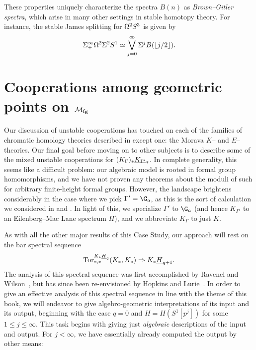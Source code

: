 \begin{remark}
These properties uniquely characterize the spectra \(B(n)\) as \textit{Brown--Gitler spectra}, which arise in many other settings in stable homotopy theory.  For instance, the stable James splitting for \(\Omega^2 S^3\) is given by \[\Sigma^\infty_+ \Omega^2 \Sigma^2 S^1 \simeq \bigvee_{j=0}^\infty \Sigma^j B(\lfloor j/2 \rfloor).\]
\end{remark}










\section{Cooperations among geometric points on \texorpdfstring{\(\mathcal{M}_{\mathbf{fg}}\)}{Mfg}}\label{CoopnsForMoravaKandHA}


Our discussion of unstable cooperations has touched on each of the families of chromatic homology theories described in  except one: the Morava \(K\)-- and \(E\)--theories.  Our final goal before moving on to other subjects is to describe some of the mixed unstable cooperations for \((K_\Gamma)_* \OS{K_{\Gamma'}}{*}\).  In complete generality, this seems like a difficult problem: our algebraic model is rooted in formal group homomorphisms, and we have not proven any theorems about the moduli of such for arbitrary finite-height formal groups.  However, the landscape brightens considerably in the case where we pick \(\Gamma' = \G_a\), as this is the sort of calculation we considered in  and .  In light of this, we specialize \(\Gamma'\) to \(\G_a\) (and hence \(K_{\Gamma'}\) to an Eilenberg--Mac Lane spectrum \(H\)), and we abbreviate \(K_\Gamma\) to just \(K\).

As with all the other major results of this Case Study, our approach will rest on the bar spectral sequence \[\Tor^{K_* \OS{H}{q}}_{*, *}(K_*, K_*) \Rightarrow K_* \OS{H}{q+1}.\]  The analysis of this spectral sequence was first accomplished by Ravenel and Wilson~\cite{RavenelWilsonKthyOfEMSpaces}, but has since been re-envisioned by Hopkins and Lurie~\cite[Section 2]{HopkinsLurie}.  In order to give an effective analysis of this spectral sequence in line with the theme of this book, we will endeavor to give algebro-geometric interpretations of its input and its output, beginning with the case \(q = 0\) and \(H = H(S^1[p^j])\) for some \(1 \le j \le \infty\).  This task begins with giving just \emph{algebraic} descriptions of the input and output.  For \(j < \infty\), we have essentially already computed the output by other means:


